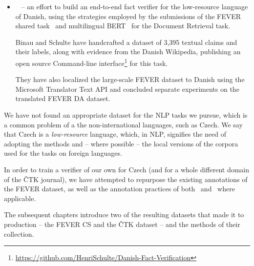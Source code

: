 \begin{itemize}
    It was collected using a \textsf{Flask} app called the \textsf{FEVER Annotations Platform}, which has been partly open-sourced\footnote{\url{https://github.com/awslabs/fever}} and thoroughly described in~\cite{fever}.
    \item {}~\cite{danish} -- an effort to build an end-to-end fact verifier for the low-resource language of Danish, using the strategies employed by the submissions of the \textsf{FEVER} shared task~\cite{fever1} and \textsf{multilingual BERT}~\cite{bert} for the Document Retrieval task.
    
    Binau and Schulte have handcrafted a dataset of 3,395 textual claims and their labels, along with evidence from the Danish \textsf{Wikipedia}, publishing an open source Command-line interface\footnote{\url{https://github.com/HenriSchulte/Danish-Fact-Verification}} for this task.
    
    They have also localized the large-scale \textsf{FEVER} dataset to Danish using the \textsf{Microsoft Translator Text API} and concluded separate experiments on the translated \textsf{FEVER DA} dataset.
\end{itemize}
We have not found an appropriate dataset for the NLP tasks we pursue, which is a common problem of a the non-international languages, such as Czech. We say that Czech is a \textit{low-resource} language, which, in NLP, signifies the need of adopting the methods and -- where possible -- the local versions of the corpora used for the tasks on foreign languages.

In order to train a verifier of our own for Czech (and for a whole different domain of the \textsf{ČTK} journal), we have attempted to repurpose the existing annotations of the \textsf{FEVER} dataset, as well as the annotation practices of both~\cite{fever} and~\cite{danish} where applicable.

The subsequent chapters introduce two of the resulting datasets that made it to production -- the {\techbf FEVER CS} and the {\techbf ČTK} dataset -- and the methods of their collection.

